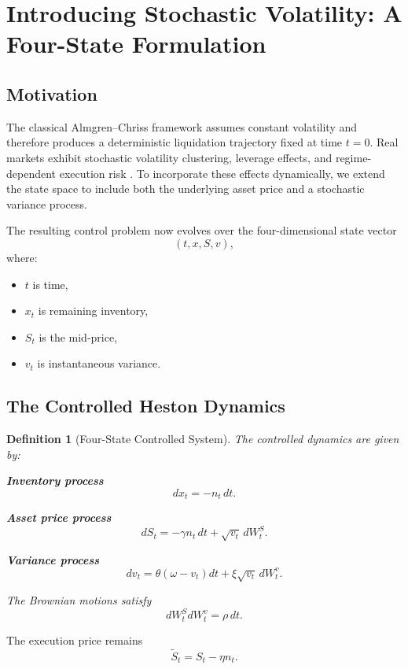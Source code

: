 \documentclass[11pt]{article}
\newtheorem{definition}[theorem]{Definition}
\begin{document}
\section{Introducing Stochastic Volatility: A Four-State Formulation}

\subsection{Motivation}

The classical Almgren--Chriss framework assumes constant volatility and therefore produces a deterministic liquidation trajectory fixed at time $t=0$. Real markets exhibit stochastic volatility clustering, leverage effects, and regime-dependent execution risk \cite{engle1982arch} \cite{black1976studies}. To incorporate these effects dynamically, we extend the state space to include both the underlying asset price and a stochastic variance process.

The resulting control problem now evolves over the four-dimensional state vector
\[
(t,x,S,v),
\]
where:
\begin{itemize}
\item $t$ is time,
\item $x_t$ is remaining inventory,
\item $S_t$ is the mid-price,
\item $v_t$ is instantaneous variance.
\end{itemize}

\subsection{The Controlled Heston Dynamics}

\begin{definition}[Four-State Controlled System]
The controlled dynamics are given by:

\textbf{Inventory process}
\[
dx_t = -n_t\,dt.
\]

\textbf{Asset price process}
\[
dS_t = -\gamma n_t\,dt + \sqrt{v_t}\,dW_t^S.
\]

\textbf{Variance process}
\[
dv_t = \theta(\omega-v_t)dt + \xi\sqrt{v_t}\,dW_t^v.
\]

The Brownian motions satisfy
\[
dW_t^S dW_t^v = \rho\,dt.
\]
\end{definition}

The execution price remains
\[
\tilde S_t = S_t - \eta n_t.
\]
\end{document}
